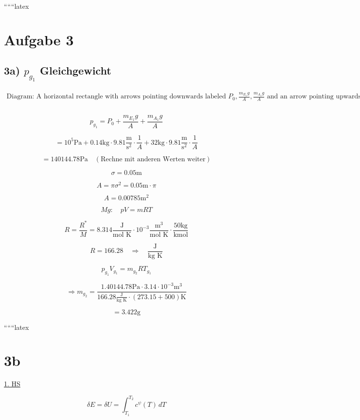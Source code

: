 
``````latex


\section*{Aufgabe 3}

\subsection*{3a) $p_{g_1}$ Gleichgewicht}

\[
\begin{array}{c}
\text{Diagram: A horizontal rectangle with arrows pointing downwards labeled } P_0, \frac{m_{E_1}g}{A}, \frac{m_{A_1}g}{A} \text{ and an arrow pointing upwards labeled } qg_{g_1}. \\
\end{array}
\]

\[
p_{g_1} = P_0 + \frac{m_{E_1}g}{A} + \frac{m_{A_1}g}{A}
\]

\[
= 10^5 \text{Pa} + 0.14 \text{kg} \cdot 9.81 \frac{\text{m}}{\text{s}^2} \cdot \frac{1}{A} + 32 \text{kg} \cdot 9.81 \frac{\text{m}}{\text{s}^2} \cdot \frac{1}{A}
\]

\[
= 140144.78 \text{Pa} \quad (\text{Rechne mit anderen Werten weiter})
\]

\[
\sigma = 0.05 \text{m}
\]

\[
A = \pi \sigma^2 = 0.05 \text{m} \cdot \pi
\]

\[
A = 0.00785 \text{m}^2
\]

\[
Mg: \quad pV = mRT
\]

\[
R = \frac{R^*}{M} = 8.314 \frac{\text{J}}{\text{mol K}} \cdot 10^{-3} \frac{\text{m}^3}{\text{mol K}} \cdot \frac{50 \text{kg}}{\text{kmol}}
\]

\[
R = 166.28 \quad \Rightarrow \quad \frac{\text{J}}{\text{kg K}}
\]

\[
p_{g_1} V_{g_1} = m_{g_2} R T_{g_1}
\]

\[
\Rightarrow m_{g_2} = \frac{1.40144.78 \text{Pa} \cdot 3.14 \cdot 10^{-3} \text{m}^3}{166.28 \frac{\text{J}}{\text{kg K}} \cdot (273.15 + 500) \text{K}}
\]

\[
= 3.422 \text{g}
\]

``````latex


\section*{3b}

\underline{1. HS}

\[
\delta E = \delta U = \int_{T_1}^{T_2} c^{\psi}(T) \, dT
\]

